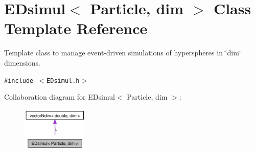 \hypertarget{classEDsimul}{
\section{EDsimul$<$ Particle, dim $>$ Class Template Reference}
\label{classEDsimul}
}
Template class to manage event-driven simulations of hyperspheres in \char`\"{}dim\char`\"{} dimensions.  


{\tt \#include $<$EDsimul.h$>$}

Collaboration diagram for EDsimul$<$ Particle, dim $>$:\nopagebreak
\begin{figure}[H]
\begin{center}
\leavevmode
\includegraphics[width=89pt]{classEDsimul__coll__graph}
\end{center}
\end{figure}
